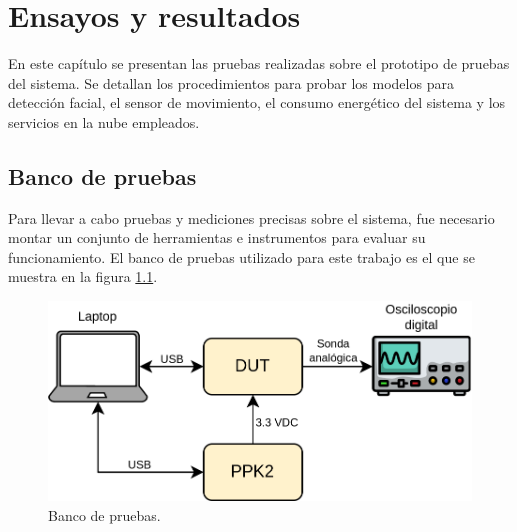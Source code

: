
\chapter{Ensayos y resultados} %
En este capítulo se presentan las pruebas realizadas sobre el prototipo de pruebas del sistema. Se detallan los procedimientos para probar los modelos para detección facial, el sensor de movimiento, el consumo energético del sistema y los servicios en la nube empleados.

\label{Chapter4} %

\section{Banco de pruebas}
Para llevar a cabo pruebas y mediciones precisas sobre el sistema, fue necesario montar un conjunto de herramientas e instrumentos para evaluar su funcionamiento. El banco de pruebas utilizado para este trabajo es el que se muestra en la figura \ref{fig:test_bench}.

\begin{figure}[h]
	\centering
	\includegraphics[scale=0.3]{./Figures/test_bench.png}
	\caption{Banco de pruebas.}
	\label{fig:test_bench}
\end{figure}

